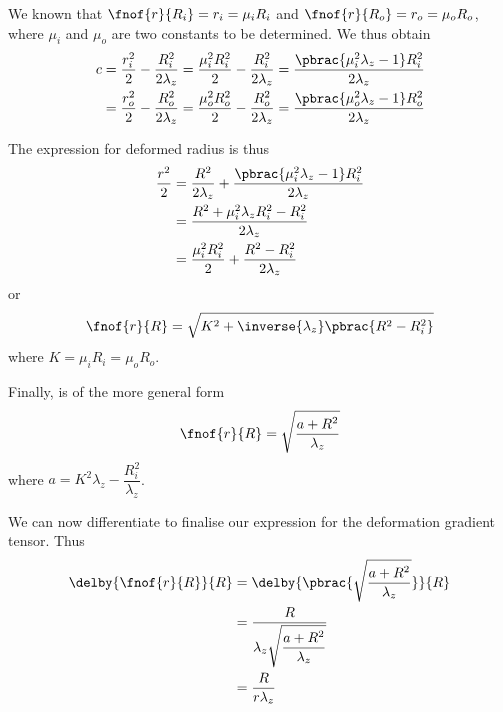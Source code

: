 We known that $\fnof{r}{R_{i}}=r_{i}=\mu_{i}R_{i}$ and
$\fnof{r}{R_{o}}=r_{o}=\mu_{o}R_{o}$, where $\mu_{i}$ and $\mu_{o}$
are two constants to be determined. We thus obtain
\begin{equation}
  \begin{split}
    c&=\dfrac{r_{i}^{2}}{2}-\dfrac{R_{i}^{2}}{2\lambda_{z}}=\dfrac{\mu_{i}^{2}R_{i}^{2}}{2}-\dfrac{R_{i}^{2}}{2\lambda_{z}}
    =\dfrac{\pbrac{\mu_{i}^{2}\lambda_{z}-1}R_{i}^{2}}{2\lambda_{z}} \\
    &=\dfrac{r_{o}^{2}}{2}-\dfrac{R_{o}^{2}}{2\lambda_{z}}=\dfrac{\mu_{o}^{2}R_{o}^{2}}{2}-\dfrac{R_{o}^{2}}{2\lambda_{z}}
    =\dfrac{\pbrac{\mu_{o}^{2}\lambda_{z}-1}R_{o}^{2}}{2\lambda_{z}} 
  \end{split}
\end{equation}

The expression for deformed radius is thus
\begin{equation}
  \begin{split}
    \dfrac{r^{2}}{2}&=\dfrac{R^{2}}{2\lambda_{z}}+\dfrac{\pbrac{\mu_{i}^{2}\lambda_{z}-1}R_{i}^{2}}{2\lambda_{z}}\\
    &=\dfrac{R^{2}+\mu_{i}^{2}\lambda_{z}R_{i}^{2}-R_{i}^{2}}{2\lambda_{z}}\\
    &=\dfrac{\mu_{i}^{2}R_{i}^{2}}{2}+\dfrac{R^{2}-R_{i}^{2}}{2\lambda_{z}}
  \end{split}
\end{equation}
or
\begin{equation}
  \fnof{r}{R}=\sqrt{K^{2}+\inverse{\lambda_{z}}\pbrac{R^{2}-R_{i}^2}}
  \label{eqn:AnalyticTubeRadialPosition}
\end{equation}
where $K=\mu_{i}R_{i}=\mu_{o}R_{o}$.

Finally,  is of the more general form 
\begin{equation}
  \fnof{r}{R}=\sqrt{\dfrac{a+R^{2}}{\lambda_{z}}}
  \label{eqn:AnalyticTubeGeneralRadialPosition}
\end{equation}
where $a=K^{2}\lambda_{z}-\dfrac{R_{i}^{2}}{\lambda_{z}}$.

We can now differentiate  to
finalise our expression for the deformation gradient tensor. Thus
\begin{equation}
  \begin{split}
    \delby{\fnof{r}{R}}{R}&=\delby{\pbrac{\sqrt{\dfrac{a+R^{2}}{\lambda_{z}}}}}{R}\\
    &=\dfrac{R}{\lambda_{z}\sqrt{\dfrac{a+R^{2}}{\lambda_{z}}}}\\
    &=\dfrac{R}{r\lambda_{z}}
  \end{split}
  \label{eqn:AnalyticTubedfdR}
\end{equation}


